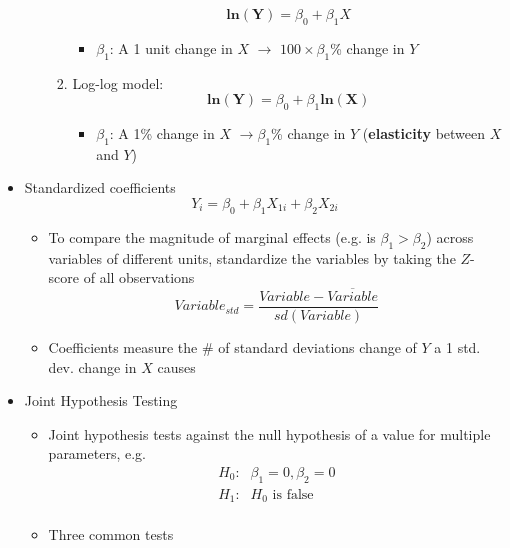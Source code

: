 \documentclass{article}
\begin{document}
\begin{itemize}
\begin{itemize}
\begin{enumerate}
			\begin{equation*}
			\mathbf{ln(Y)}=\beta_0+\beta_1X	
			\end{equation*}
			\begin{itemize}
				\item $\beta_1$: A 1 unit change in $X$ $\rightarrow$ $100 \times \beta_1$\% change in $Y$
			\end{itemize}
			\item Log-log model:
			\begin{equation*}
			\mathbf{ln(Y)}=\beta_0+\beta_1\mathbf{ln(X)}	
			\end{equation*}		
			\begin{itemize}
				\item $\beta_1$: A 1\% change in $X$ $\rightarrow\beta_1$\% change in $Y$ (\textbf{elasticity} between $X$ and $Y$)
			\end{itemize}
		\end{enumerate}
	\end{itemize}
	\item Standardized coefficients
	\begin{equation*}
	Y_i=\beta_0+\beta_1X_{1i}+\beta_2X_{2i}
	\end{equation*}
	\begin{itemize}
		\item To compare the magnitude of marginal effects (e.g. is $\beta_1 > \beta_2$) across variables of different units, standardize the variables by taking the $Z$-score of all observations
		\begin{equation*}
		Variable_{std}=\frac{Variable-\overline{Variable}}{sd(Variable)}	
		\end{equation*}
		\item Coefficients measure the \# of standard deviations change of $Y$ a 1 std. dev. change in $X$ causes
	\end{itemize}
	\item Joint Hypothesis Testing
	\begin{itemize}
		\item Joint hypothesis tests against the null hypothesis of a value for multiple parameters, e.g. 
		\begin{align*}
		H_0\text{:} & \beta_1=0, \beta_2=0\\
		H_1\text{:} & H_0 \text{ is false} \\
		\end{align*}
		\item Three common tests
		\begin{enumerate}

\end{enumerate}
\end{itemize}
\end{itemize}
\end{document}
